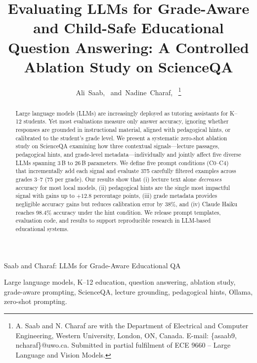 \documentclass[journal]{IEEEtran}
\begin{document}
\title{Evaluating LLMs for Grade-Aware and Child-Safe Educational
       Question Answering: A Controlled Ablation Study on ScienceQA}

\author{Ali~Saab,~
        and~Nadine~Charaf,~
\thanks{A. Saab and N. Charaf are with the Department of Electrical
and Computer Engineering, Western University, London, ON, Canada.
E-mail: \{asaab9, ncharaf\}@uwo.ca. Submitted in partial fulfilment of
ECE 9660 -- Large Language and Vision Models.}}

%
{Saab and Charaf: LLMs for Grade-Aware Educational QA}

\maketitle

\begin{abstract}
Large language models (LLMs) are increasingly deployed as tutoring
assistants for K--12 students. Yet most evaluations measure only answer
accuracy, ignoring whether responses are grounded in instructional material,
aligned with pedagogical hints, or calibrated to the student's grade level.
We present a systematic zero-shot ablation study on ScienceQA examining
how three contextual signals---lecture passages, pedagogical hints, and
grade-level metadata---individually and jointly affect five diverse LLMs
spanning 3\,B to 26\,B parameters. We define five prompt conditions (C0--C4)
that incrementally add each signal and evaluate 375 carefully filtered examples
across grades 3--7 (75 per grade). Our results show that (i) lecture text
alone \emph{decreases} accuracy for most local models, (ii) pedagogical hints
are the single most impactful signal with gains up to $+12.8$ percentage
points, (iii) grade metadata provides negligible accuracy gains but reduces
calibration error by 38\%, and (iv) Claude Haiku reaches 98.4\% accuracy
under the hint condition. We release prompt templates, evaluation code, and
results to support reproducible research in LLM-based educational systems.
\end{abstract}

\begin{IEEEkeywords}
Large language models, K--12 education, question answering, ablation study,
grade-aware prompting, ScienceQA, lecture grounding, pedagogical hints,
Ollama, zero-shot prompting.
\end{IEEEkeywords}
\end{document}

